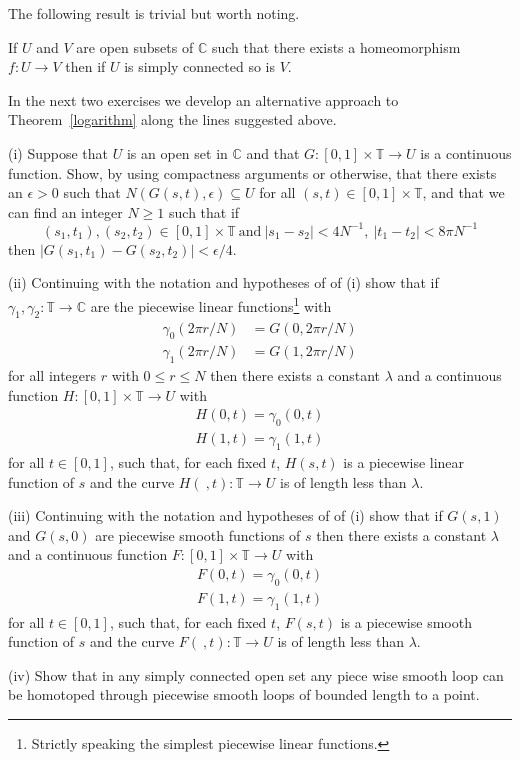 The following result is trivial but worth noting.
\begin{lemma} If $U$ and $V$ are open subsets of ${\mathbb C}$
such that there exists a homeomorphism $f:U\rightarrow V$
then if $U$ is simply connected so is $V$.
\end{lemma}
\begin{exercise} In the next two exercises
we develop an alternative approach to
Theorem~\ref{logarithm} along the lines suggested above.

(i) Suppose that $U$ is an open set in ${\mathbb C}$
and that $G:[0,1]\times{\mathbb T}\rightarrow U$
is a continuous function. Show, by using compactness 
arguments or otherwise, that there exists an $\epsilon>0$
such that $N(G(s,t),\epsilon)\subseteq U$ for all
$(s,t)\in [0,1]\times{\mathbb T}$, and that we can find
an integer $N\geq 1$ such that if  
\[(s_{1},t_{1}),(s_{2},t_{2})\in [0,1]\times{\mathbb T}
\ \text{and}\ |s_{1}-s_{2}|<4N^{-1},
\ |t_{1}-t_{2}|<8\pi N^{-1}\]
then $|G(s_{1},t_{1})-G(s_{2},t_{2})|<\epsilon/4$.

(ii) Continuing with the notation and hypotheses of
of (i) show that if 
$\gamma_{1},\gamma_{2}:{\mathbb T}\rightarrow{\mathbb C}$
are the piecewise linear functions\footnote{Strictly speaking
the simplest piecewise linear functions.} with
\begin{align*}
\gamma_{0}(2\pi r/N)&=G(0,2\pi r/N)\\
\gamma_{1}(2\pi r/N)&=G(1,2\pi r/N)
\end{align*}
for all integers $r$ with $0\leq r\leq N$
then there exists a constant $\lambda$
and a continuous function
$H:[0,1]\times{\mathbb T}\rightarrow U$
with
\begin{align*}
H(0,t)=\gamma_{0}(0,t)\\
H(1,t)=\gamma_{1}(1,t)
\end{align*}
for all $t\in [0,1]$, such that, for each fixed $t$,
$H(s,t)$ is a piecewise
linear function of $s$ and the curve
$H(\ ,t):{\mathbb T}\rightarrow U$ is of length less than
$\lambda$.

(iii) Continuing with the notation and hypotheses of
of (i) show that if $G(s,1)$ and $G(s,0)$ are piecewise
smooth functions of $s$
then there exists a constant $\lambda$ and 
a continuous function
$F:[0,1]\times{\mathbb T}\rightarrow U$
with
\begin{align*}
F(0,t)=\gamma_{0}(0,t)\\
F(1,t)=\gamma_{1}(1,t)
\end{align*}
for all $t\in [0,1]$, such that, for each fixed $t$,
$F(s,t)$ is a piecewise
smooth function of $s$ and the curve
$F(\ ,t):{\mathbb T}\rightarrow U$ is of length less than
$\lambda$.

(iv) Show that in any simply connected open set
any piece wise smooth loop can be homotoped
through piecewise smooth loops of bounded length to
a point.
\end{exercise}
